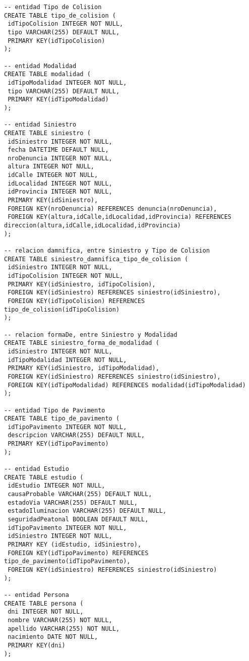 \begin{verbatim}
-- entidad Tipo de Colision
CREATE TABLE tipo_de_colision (
 idTipoColision INTEGER NOT NULL,
 tipo VARCHAR(255) DEFAULT NULL,
 PRIMARY KEY(idTipoColision)
);

-- entidad Modalidad
CREATE TABLE modalidad (
 idTipoModalidad INTEGER NOT NULL,
 tipo VARCHAR(255) DEFAULT NULL,
 PRIMARY KEY(idTipoModalidad)
);

-- entidad Siniestro
CREATE TABLE siniestro (
 idSiniestro INTEGER NOT NULL,
 fecha DATETIME DEFAULT NULL,
 nroDenuncia INTEGER NOT NULL,
 altura INTEGER NOT NULL,
 idCalle INTEGER NOT NULL,
 idLocalidad INTEGER NOT NULL,
 idProvincia INTEGER NOT NULL,
 PRIMARY KEY(idSiniestro),
 FOREIGN KEY(nroDenuncia) REFERENCES denuncia(nroDenuncia),
 FOREIGN KEY(altura,idCalle,idLocalidad,idProvincia) REFERENCES direccion(altura,idCalle,idLocalidad,idProvincia)
);

-- relacion damnifica, entre Siniestro y Tipo de Colision
CREATE TABLE siniestro_damnifica_tipo_de_colision (
 idSiniestro INTEGER NOT NULL,
 idTipoColision INTEGER NOT NULL,
 PRIMARY KEY(idSiniestro, idTipoColision),
 FOREIGN KEY(idSiniestro) REFERENCES siniestro(idSiniestro),
 FOREIGN KEY(idTipoColision) REFERENCES tipo_de_colision(idTipoColision)
);

-- relacion formaDe, entre Siniestro y Modalidad
CREATE TABLE siniestro_forma_de_modalidad (
 idSiniestro INTEGER NOT NULL,
 idTipoModalidad INTEGER NOT NULL,
 PRIMARY KEY(idSiniestro, idTipoModalidad),
 FOREIGN KEY(idSiniestro) REFERENCES siniestro(idSiniestro),
 FOREIGN KEY(idTipoModalidad) REFERENCES modalidad(idTipoModalidad)
);

-- entidad Tipo de Pavimento
CREATE TABLE tipo_de_pavimento (
 idTipoPavimento INTEGER NOT NULL,
 descripcion VARCHAR(255) DEFAULT NULL,
 PRIMARY KEY(idTipoPavimento)
);

-- entidad Estudio
CREATE TABLE estudio (
 idEstudio INTEGER NOT NULL,
 causaProbable VARCHAR(255) DEFAULT NULL,
 estadoVia VARCHAR(255) DEFAULT NULL,
 estadoIluminacion VARCHAR(255) DEFAULT NULL,
 seguridadPeatonal BOOLEAN DEFAULT NULL,
 idTipoPavimento INTEGER NOT NULL,
 idSiniestro INTEGER NOT NULL,
 PRIMARY KEY (idEstudio, idSiniestro),
 FOREIGN KEY(idTipoPavimento) REFERENCES tipo_de_pavimento(idTipoPavimento),
 FOREIGN KEY(idSiniestro) REFERENCES siniestro(idSiniestro)
);

-- entidad Persona
CREATE TABLE persona (
 dni INTEGER NOT NULL,
 nombre VARCHAR(255) NOT NULL,
 apellido VARCHAR(255) NOT NULL,
 nacimiento DATE NOT NULL,
 PRIMARY KEY(dni)
);


\end{verbatim}
